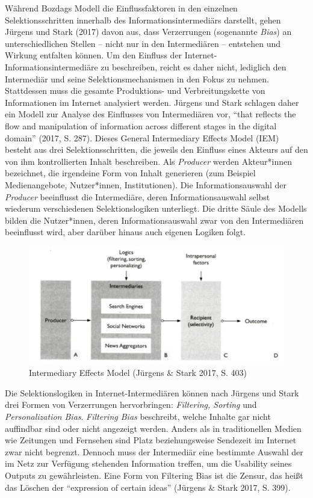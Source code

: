 \documentclass[a4paper,
fontsize=11pt,
oneside,
numbers=noperiodatend,
parskip=half-,
bibliography=totoc,
final
]{scrartcl}
\begin{document}
Während Bozdags Modell die Einflussfaktoren in den einzelnen
Selektionsschritten innerhalb des Informationsintermediärs darstellt,
gehen Jürgens und Stark (2017) davon aus, dass Verzerrungen (sogenannte
\emph{Bias}) an unterschiedlichen Stellen -- nicht nur in den
Intermediären -- entstehen und Wirkung entfalten können. Um den Einfluss
der Internet-Informationsintermediäre zu beschreiben, reicht es daher
nicht, lediglich den Intermediär und seine Selektionsmechanismen in den
Fokus zu nehmen. Stattdessen muss die gesamte Produktions- und
Verbreitungskette von Informationen im Internet analysiert werden.
Jürgens und Stark schlagen daher ein Modell zur Analyse des Einflusses
von Intermediären vor, \enquote{that reflects the flow and manipulation
of information across different stages in the digital domain} (2017, S.
287). Dieses General Intermediary Effects Model (IEM) besteht aus drei
Selektionsschritten, die jeweils den Einfluss eines Akteurs auf den von
ihm kontrollierten Inhalt beschreiben. Als \emph{Producer} werden
Akteur*innen bezeichnet, die irgendeine Form von Inhalt generieren (zum
Beispiel Medienangebote, Nutzer*innen, Institutionen). Die
Informationsauswahl der \emph{Producer} beeinflusst die Intermediäre,
deren Informationsauswahl selbst wiederum verschiedenen
Selektionslogiken unterliegt. Die dritte Säule des Modells bilden die
Nutzer*innen, deren Informationsauswahl zwar von den Intermediären
beeinflusst wird, aber darüber hinaus auch eigenen Logiken folgt.

\begin{figure}
\centering
\includegraphics{img/leyer_abb2.png}
\caption{Intermediary Effects Model (Jürgens \& Stark 2017, S. 403)}
\end{figure}

Die Selektionslogiken in Internet-Intermediären können nach Jürgens und
Stark drei Formen von Verzerrungen hervorbringen: \emph{Filtering,
Sorting} und \emph{Personalization Bias}. \emph{Filtering Bias}
beschreibt, welche Inhalte gar nicht auffindbar sind oder nicht
angezeigt werden. Anders als in traditionellen Medien wie Zeitungen und
Fernsehen sind Platz beziehungsweise Sendezeit im Internet zwar nicht
begrenzt. Dennoch muss der Intermediär eine bestimmte Auswahl der im
Netz zur Verfügung stehenden Information treffen, um die Usability
seines Outputs zu gewährleisten. Eine Form von Filtering Bias ist die
Zensur, das heißt das Löschen der \enquote{expression of certain ideas}
(Jürgens \& Stark 2017, S. 399).
\end{document}

